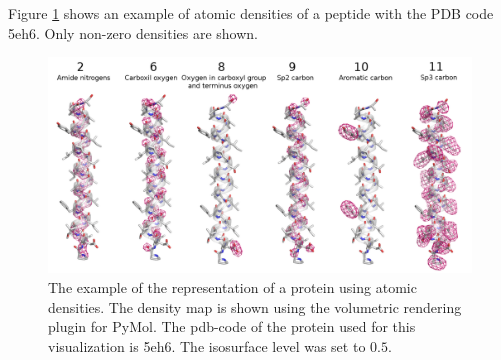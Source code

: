 Figure \ref{Fig:atomic_densities} shows an example of atomic densities of a peptide with the PDB code 5eh6.
Only non-zero densities are shown.

\begin{figure}[H]
    \centering
    \includegraphics[width=\linewidth]{Fig/atomic_densities_V3.png}
    \caption{The example of the representation of a protein using atomic densities. The density map is 
    shown using the volumetric rendering plugin for PyMol. The pdb-code of the protein used for this visualization is 5eh6.
    The isosurface level was set to $0.5$.}
    \label{Fig:atomic_densities}
\end{figure}